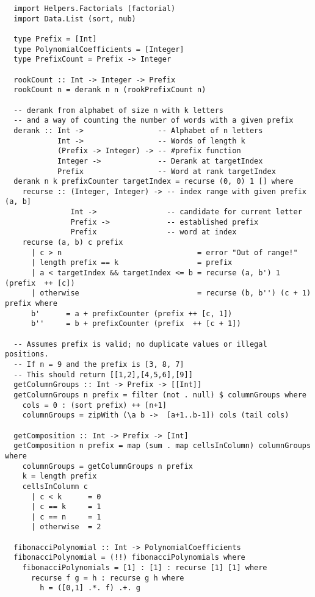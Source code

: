 \begin{lstlisting}
  import Helpers.Factorials (factorial)
  import Data.List (sort, nub)

  type Prefix = [Int]
  type PolynomialCoefficients = [Integer]
  type PrefixCount = Prefix -> Integer

  rookCount :: Int -> Integer -> Prefix
  rookCount n = derank n n (rookPrefixCount n)

  -- derank from alphabet of size n with k letters
  -- and a way of counting the number of words with a given prefix
  derank :: Int ->                 -- Alphabet of n letters
            Int ->                 -- Words of length k
            (Prefix -> Integer) -> -- #prefix function
            Integer ->             -- Derank at targetIndex
            Prefix                 -- Word at rank targetIndex
  derank n k prefixCounter targetIndex = recurse (0, 0) 1 [] where
    recurse :: (Integer, Integer) -> -- index range with given prefix (a, b]
               Int ->                -- candidate for current letter
               Prefix ->             -- established prefix
               Prefix                -- word at index
    recurse (a, b) c prefix
      | c > n                               = error "Out of range!"
      | length prefix == k                  = prefix
      | a < targetIndex && targetIndex <= b = recurse (a, b') 1 (prefix  ++ [c])
      | otherwise                           = recurse (b, b'') (c + 1) prefix where
      b'      = a + prefixCounter (prefix ++ [c, 1])
      b''     = b + prefixCounter (prefix  ++ [c + 1])

  -- Assumes prefix is valid; no duplicate values or illegal positions.
  -- If n = 9 and the prefix is [3, 8, 7]
  -- This should return [[1,2],[4,5,6],[9]]
  getColumnGroups :: Int -> Prefix -> [[Int]]
  getColumnGroups n prefix = filter (not . null) $ columnGroups where
    cols = 0 : (sort prefix) ++ [n+1]
    columnGroups = zipWith (\a b ->  [a+1..b-1]) cols (tail cols)

  getComposition :: Int -> Prefix -> [Int]
  getComposition n prefix = map (sum . map cellsInColumn) columnGroups where
    columnGroups = getColumnGroups n prefix
    k = length prefix
    cellsInColumn c
      | c < k      = 0
      | c == k     = 1
      | c == n     = 1
      | otherwise  = 2

  fibonacciPolynomial :: Int -> PolynomialCoefficients
  fibonacciPolynomial = (!!) fibonacciPolynomials where
    fibonacciPolynomials = [1] : [1] : recurse [1] [1] where
      recurse f g = h : recurse g h where
        h = ([0,1] .*. f) .+. g


\end{lstlisting}
